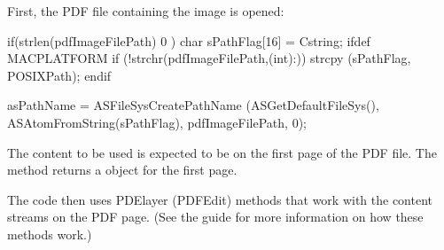 \documentclass[letterpaper,12pt,english,openany,oneside]{sphinxmanual}
\begin{document}
\begin{sphinxVerbatim}[commandchars=\\\{\}]
 
           
                   
                       
    
  
    
    
\end{sphinxVerbatim}

First, the PDF file containing the image is opened:

\begin{sphinxVerbatim}[commandchars=\\\{\}]
if(strlen(pdfImageFilePath) \PYGZgt{} 0 ) \PYGZob{}
     char sPathFlag[16] = \PYGZdq{}Cstring\PYGZdq{};
 \PYGZsh{}ifdef MAC\PYGZus{}PLATFORM
 if (!strchr(pdfImageFilePath,(int)\PYGZsq{}:\PYGZsq{}))
     strcpy (sPathFlag, \PYGZdq{}POSIXPath\PYGZdq{});
 \PYGZsh{}endif

 asPathName = ASFileSysCreatePathName (ASGetDefaultFileSys(),
     ASAtomFromString(sPathFlag), pdfImageFilePath, 0);
\end{sphinxVerbatim}

The content to be used is expected to be on the first page of the PDF file. The  method returns a  object for the first page.

\begin{sphinxVerbatim}[commandchars=\\\{\}]
   
\end{sphinxVerbatim}

The code then uses PDE\sphinxhyphen{}layer (PDFEdit) methods that work with the content streams on the PDF page. (See the  guide for more information on how these methods work.)
\end{document}
